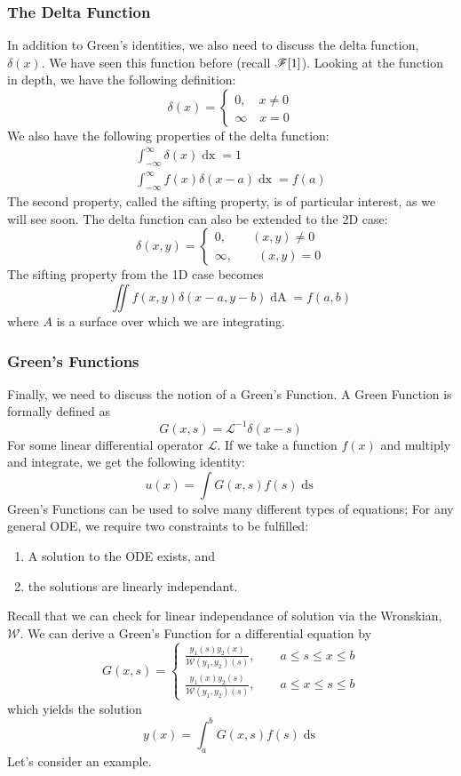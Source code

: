 \subsubsection{The Delta Function}
In addition to Green's identities, we also need to discuss the delta function, $\delta(x)$. We have
seen this function before (recall $\mathscr{F}[1]$). Looking at the function in depth, we have the following
definition:
\[
\delta(x)=
\begin{cases*}
0,\quad x\neq0\\
\infty\quad x=0
\end{cases*}
\]
We also have the following properties of the delta function:
\begin{gather*}
\int_{-\infty}^{\infty}\delta(x)\mathop{dx} = 1\\
\int_{-\infty}^{\infty}f(x)\delta(x-a)\mathop{dx} = f(a)
\end{gather*}
The second property, called the sifting property, is of particular interest, as we will see soon.
The delta function can also be extended to the 2D case:
\[
\delta(x,y) =
\begin{cases*}
0,\qquad(x,y)\neq0\\
\infty,\qquad(x,y)=0
\end{cases*}
\]
The sifting property from the 1D case becomes
\[
\iint f(x,y)\delta(x-a,y-b)\mathop{dA} = f(a,b)
\]
where $A$ is a surface over which we are integrating.
\subsubsection{Green's Functions}
Finally, we need to discuss the notion of a Green's Function. A Green Function is formally defined
as
\[
G(x,s) = \mathcal{L}^{-1}\delta(x-s)
\]
For some linear differential operator $\mathcal{L}$. If we take a function $f(x)$ and multiply and
integrate, we get the following identity:
\[
u(x) = \int G(x,s)f(s)\mathop{ds}
\]
Green's Functions can be used to solve many different types of equations;
For any general ODE, we require two constraints to be fulfilled:
\begin{enumerate}
\item A solution to the ODE exists, and
\item the solutions are linearly independant.
\end{enumerate}
Recall that we can check for linear independance of solution via the Wronskian, $\mathcal{W}$.
We can derive a Green's Function for a differential equation by
\[
G(x,s) =
\begin{cases*}
\frac{y_{1}(s)y_{2}(x)}{\mathcal{W}(y_{1},y_{2})(s)},\qquad a\leq s\leq x\leq b\\
\frac{y_{1}(x)y_{2}(s)}{\mathcal{W}(y_{1},y_{2})(s)},\qquad a\leq x\leq s\leq b
\end{cases*}
\]
which yields the solution
\[
y(x) = \int_{a}^{b}G(x,s)f(s)\mathop{ds}
\]
Let's consider an example.\\

